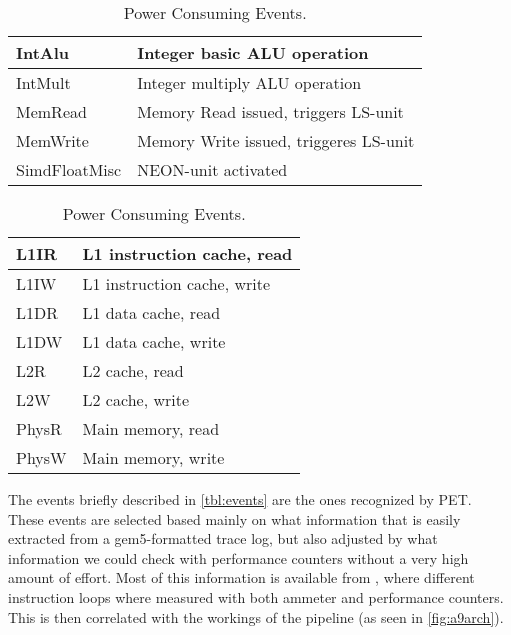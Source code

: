 \begin{table}[ht]
    \centering
    \begin{minipage}[b]{\linewidth}
        \centering
        \begin{tabular}{|l|l|}
            \hline
            IntAlu    & Integer basic ALU operation\\
            \hline
            IntMult    & Integer multiply ALU operation \\
            \hline
            MemRead    & Memory Read issued, triggers LS-unit \\
            \hline
            MemWrite    & Memory Write issued, triggeres LS-unit \\
            \hline
            SimdFloatMisc     & NEON-unit activated \\
            \hline
        \end{tabular}
    \end{minipage}

    \begin{minipage}[b]{\linewidth}
        \centering
        \begin{tabular}{|l|l|}
            \hline
            L1IR    & L1 instruction cache, read \\
            \hline
            L1IW    & L1 instruction cache, write \\
            \hline
            L1DR    & L1 data cache, read \\
            \hline
            L1DW    & L1 data cache, write \\
            \hline
            L2R     & L2 cache, read \\
            \hline
            L2W     & L2 cache, write \\
            \hline
            PhysR   & Main memory, read \\
            \hline
            PhysW   & Main memory, write \\
            \hline
        \end{tabular}
    \end{minipage}
    \caption{Power Consuming Events.}
    \label{tbl:events}
\end{table}

The events briefly described in \autoref{tbl:events} are the ones recognized by
PET. These events are selected based mainly on what information that is easily
extracted from a gem5-formatted trace log, but also adjusted by what information
we could check with performance counters without a very high amount of effort.
Most of this information is available from \cite{rundehvatum2013exploring},
where different instruction loops where measured with both ammeter and
performance counters. This is then correlated with the workings of
the pipeline (as seen in \autoref{fig:a9arch}).

